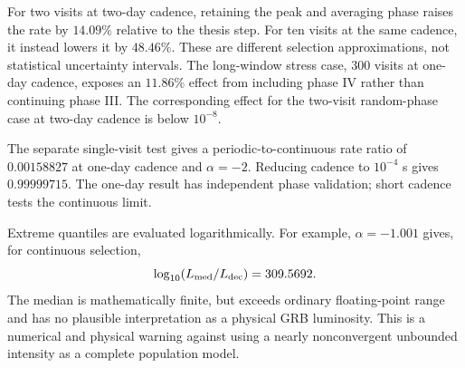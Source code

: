 For two visits at two-day cadence, retaining the peak and averaging phase
raises the rate by $14.09\%$ relative to the thesis step. For ten visits at
the same cadence, it instead lowers it by $48.46\%$. These are different
selection approximations, not statistical uncertainty intervals. The long-window
stress case, 300 visits at one-day cadence, exposes an $11.86\%$ effect from
including phase IV rather than continuing phase III. The corresponding effect
for the two-visit random-phase case at two-day cadence is below $10^{-8}$.

The separate single-visit test gives a periodic-to-continuous rate ratio
of $0.00158827$ at one-day cadence and $\alpha=-2$. Reducing cadence to
$10^{-4}$ s gives $0.99999715$. The one-day result has independent phase
validation; short cadence tests the continuous limit.

Extreme quantiles are evaluated logarithmically. For example,
$\alpha=-1.001$ gives, for continuous selection,
\[\log_{10}(L_{\rm med}/L_{\rm dec})=309.5692.\]
The median is mathematically finite, but exceeds ordinary
floating-point range and has no plausible interpretation as a physical GRB
luminosity. This is a numerical and physical warning against using a
nearly nonconvergent unbounded intensity as a complete population model.

